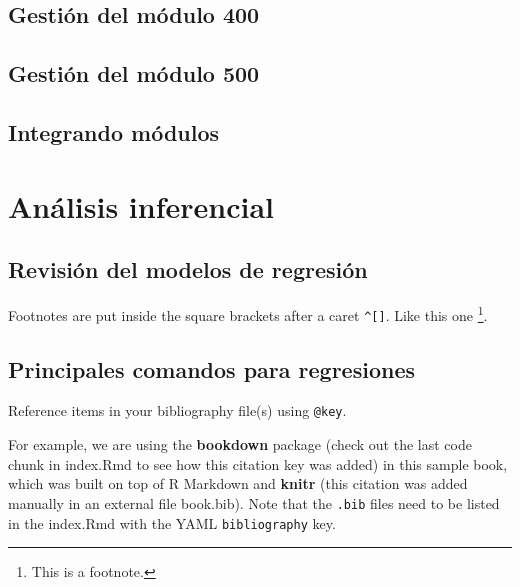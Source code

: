 \documentclass[
]{book}
\theoremstyle{definition}
\theoremstyle{definition}
\theoremstyle{definition}
\theoremstyle{definition}
\theoremstyle{remark}
\begin{document}
\hypertarget{gestiuxf3n-del-muxf3dulo-400}{%
\section{Gestión del módulo 400}\label{gestiuxf3n-del-muxf3dulo-400}}

\hypertarget{gestiuxf3n-del-muxf3dulo-500}{%
\section{Gestión del módulo 500}\label{gestiuxf3n-del-muxf3dulo-500}}

\hypertarget{integrando-muxf3dulos}{%
\section{Integrando módulos}\label{integrando-muxf3dulos}}

\hypertarget{anuxe1lisis-inferencial}{%
\chapter{Análisis inferencial}\label{anuxe1lisis-inferencial}}

\hypertarget{revisiuxf3n-del-modelos-de-regresiuxf3n}{%
\section{Revisión del modelos de regresión}\label{revisiuxf3n-del-modelos-de-regresiuxf3n}}

Footnotes are put inside the square brackets after a caret \texttt{\^{}{[}{]}}. Like this one \footnote{This is a footnote.}.

\hypertarget{principales-comandos-para-regresiones}{%
\section{Principales comandos para regresiones}\label{principales-comandos-para-regresiones}}

Reference items in your bibliography file(s) using \texttt{@key}.

For example, we are using the \textbf{bookdown} package \citep{R-bookdown} (check out the last code chunk in index.Rmd to see how this citation key was added) in this sample book, which was built on top of R Markdown and \textbf{knitr} \citep{xie2015} (this citation was added manually in an external file book.bib).
Note that the \texttt{.bib} files need to be listed in the index.Rmd with the YAML \texttt{bibliography} key.
\end{document}
